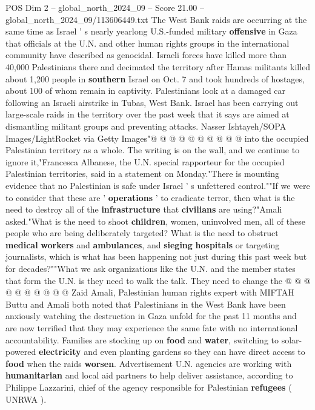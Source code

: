 \begin{textsample}{POS Dim 2 – global\_north\_2024\_09 – Score 21.00 – global\_north\_2024\_09/113606449.txt}
The West Bank raids are occurring at the same time as Israel ' s nearly yearlong U.S.-funded military \textbf{offensive} in Gaza that officials at the U.N. and other human rights groups in the international community have described as genocidal.
Israeli forces have killed more than 40,000 Palestinians there and decimated the territory after Hamas militants killed about 1,200 people in \textbf{southern} Israel on Oct. 7 and took hundreds of hostages, about 100 of whom remain in captivity.
Palestinians look at a damaged car following an Israeli airstrike in Tubas, West Bank.
Israel has been carrying out large-scale raids in the territory over the past week that it says are aimed at dismantling militant groups and preventing attacks.
Nasser Ishtayeh/SOPA Images/LightRocket via Getty Images"@ @ @ @ @ @ @ @ @ @ into the occupied Palestinian territory as a whole.
The writing is on the wall, and we continue to ignore it,"Francesca Albanese, the U.N. special rapporteur for the occupied Palestinian territories, said in a statement on Monday."There is mounting evidence that no Palestinian is safe under Israel ' s unfettered control.""If we were to consider that these are ' \textbf{operations} ' to eradicate terror, then what is the need to destroy all of the \textbf{infrastructure} that \textbf{civilians} are using?"Amali asked."What is the need to shoot \textbf{children}, women, uninvolved men, all of these people who are being deliberately targeted?
What is the need to obstruct \textbf{medical} \textbf{workers} and \textbf{ambulances}, and \textbf{sieging} \textbf{hospitals} or targeting journalists, which is what has been happening not just during this past week but for decades?""What we ask organizations like the U.N. and the member states that form the U.N. is they need to walk the talk.
They need to change the @ @ @ @ @ @ @ @ @ @ Zaid Amali, Palestinian human rights expert with MIFTAH Buttu and Amali both noted that Palestinians in the West Bank have been anxiously watching the destruction in Gaza unfold for the past 11 months and are now terrified that they may experience the same fate with no international accountability.
Families are stocking up on \textbf{food} and \textbf{water}, switching to solar-powered \textbf{electricity} and even planting gardens so they can have direct access to \textbf{food} when the raids \textbf{worsen}.
Advertisement U.N. agencies are working with \textbf{humanitarian} and local aid partners to help deliver assistance, according to Philippe Lazzarini, chief of the agency responsible for Palestinian \textbf{refugees} ( UNRWA ).

\end{textsample}
